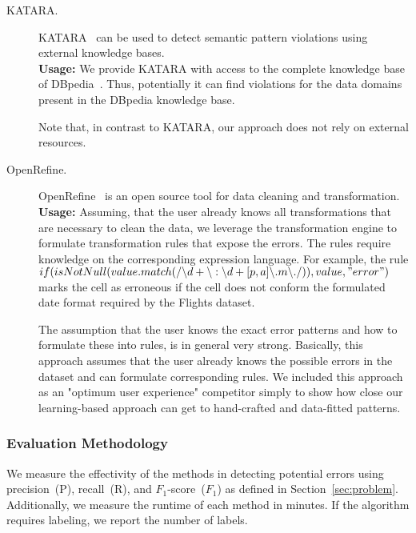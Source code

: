 \begin{description}
  \item[KATARA.] KATARA~\cite{chu2015katara} can be used to detect semantic pattern violations using external knowledge bases.\\
  \textbf{Usage:}
  We provide KATARA with access to the complete knowledge base of DBpedia~\cite{lehmann2015dbpedia}. Thus, potentially it can find violations for the data domains present in the DBpedia knowledge base.
  
  Note that, in contrast to KATARA, our approach does not rely on external resources.
  
  \item[OpenRefine. \label{sec:openrefine}] OpenRefine~\cite{verborgh2013using} is an open source tool for data cleaning and transformation. \\
  \textbf{Usage:} 
  Assuming, that the user already knows all transformations that are necessary to clean the data, 
  we leverage the transformation engine to formulate transformation rules that expose the errors. The rules require knowledge on the corresponding expression language. For example, the rule $if(isNotNull(value.match(/{\backslash}d+{\backslash}:{\backslash}d+ [p,a]{\backslash}.m{\backslash}./)), value, "error")$ marks the cell as erroneous if the cell does not conform  the formulated date format required by the Flights dataset. 
  
  The assumption that the user knows the exact error patterns and how to formulate these into rules, is in general very strong. Basically, this approach assumes that the user already knows the possible errors in the dataset and can formulate corresponding rules. We included this approach as an "optimum user experience" competitor simply to show how close our learning-based approach can get to hand-crafted and data-fitted patterns.
\end{description}

\subsubsection{Evaluation Methodology}
We measure the effectivity of the methods in detecting potential errors using precision~(P), recall~(R), and $F_1$-score~($F_1$) as defined in Section~\ref{sec:problem}.
Additionally, we measure the runtime of each method in minutes. If the algorithm requires labeling, we report the number of labels. 

